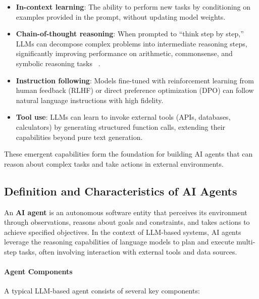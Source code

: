 \begin{itemize}
    \item \textbf{In-context learning}: The ability to perform new tasks by conditioning on examples provided in the prompt, without updating model weights.
    \item \textbf{Chain-of-thought reasoning}: When prompted to ``think step by step,'' LLMs can decompose complex problems into intermediate reasoning steps, significantly improving performance on arithmetic, commonsense, and symbolic reasoning tasks~%
    .
    \item \textbf{Instruction following}: Models fine-tuned with reinforcement learning from human feedback (RLHF) or direct preference optimization (DPO) can follow natural language instructions with high fidelity.
    \item \textbf{Tool use}: LLMs can learn to invoke external tools (APIs, databases, calculators) by generating structured function calls, extending their capabilities beyond pure text generation.
\end{itemize}

These emergent capabilities form the foundation for building AI agents that can reason about complex tasks and take actions in external environments.

\subsection{Definition and Characteristics of AI Agents}

An \textbf{AI agent} is an autonomous software entity that perceives its environment through observations, reasons about goals and constraints, and takes actions to achieve specified objectives. In the context of LLM-based systems, AI agents leverage the reasoning capabilities of language models to plan and execute multi-step tasks, often involving interaction with external tools and data sources.

\paragraph{Agent Components}
A typical LLM-based agent consists of several key components:

